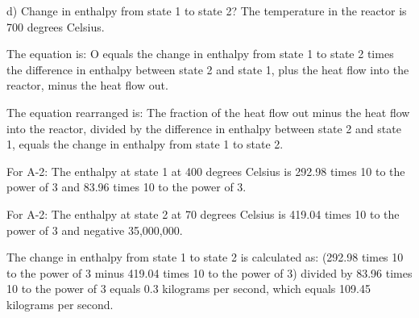 d) Change in enthalpy from state 1 to state 2? The temperature in the reactor is 700 degrees Celsius.

The equation is:
O equals the change in enthalpy from state 1 to state 2 times the difference in enthalpy between state 2 and state 1, plus the heat flow into the reactor, minus the heat flow out.

The equation rearranged is:
The fraction of the heat flow out minus the heat flow into the reactor, divided by the difference in enthalpy between state 2 and state 1, equals the change in enthalpy from state 1 to state 2.

For A-2: The enthalpy at state 1 at 400 degrees Celsius is 292.98 times 10 to the power of 3 and 83.96 times 10 to the power of 3.

For A-2: The enthalpy at state 2 at 70 degrees Celsius is 419.04 times 10 to the power of 3 and negative 35,000,000.

The change in enthalpy from state 1 to state 2 is calculated as:
(292.98 times 10 to the power of 3 minus 419.04 times 10 to the power of 3) divided by 83.96 times 10 to the power of 3 equals 0.3 kilograms per second, which equals 109.45 kilograms per second.